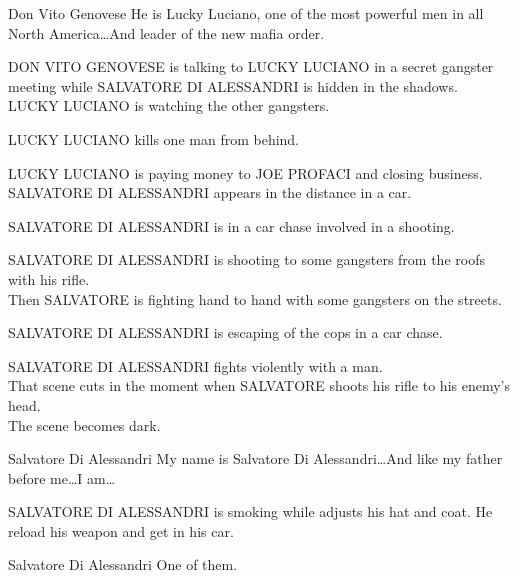 \documentclass{screenplay}[2020/03/26]
\begin{document}
\begin{dialogue}[explaining]{Don Vito Genovese}
He is Lucky Luciano, one of the most powerful men in all North America\dots And leader of the new mafia order.
\end{dialogue}


\fadein
{}
DON VITO GENOVESE is talking to LUCKY LUCIANO in a secret gangster meeting while SALVATORE DI ALESSANDRI is hidden in the shadows.
\\LUCKY LUCIANO is watching the other gangsters.


\fadeout
{}
LUCKY LUCIANO kills one man from behind.


\fadein
{}
LUCKY LUCIANO is paying money to JOE PROFACI and closing business.
\\SALVATORE DI ALESSANDRI appears in the distance in a car. 


\fadeout
{}
SALVATORE DI ALESSANDRI is in a car chase involved in a shooting.


\fadein
{}
SALVATORE DI ALESSANDRI is shooting to some gangsters from the roofs with his rifle.
\\Then SALVATORE is fighting hand to hand with some gangsters on the streets.


\fadeout
{}
SALVATORE DI ALESSANDRI is escaping of the cops in a car chase.


\fadein
{}
SALVATORE DI ALESSANDRI fights violently with a man.
\\That scene cuts in the moment when SALVATORE shoots his rifle to his enemy's head.
\\The scene becomes dark.

\begin{dialogue}[narrating]{Salvatore Di Alessandri}
My name is Salvatore Di Alessandri\dots And like my father before me\dots I am\dots
\end{dialogue}


\fadein
{}
SALVATORE DI ALESSANDRI is smoking while adjusts his hat and coat. He reload his weapon and get in his car.

\begin{dialogue}[narrating]{Salvatore Di Alessandri}
One of them.
\end{dialogue}

\end{document}
